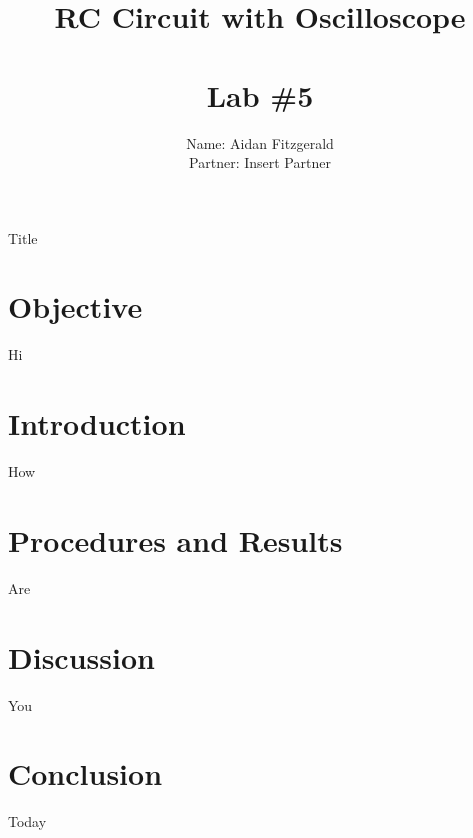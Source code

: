 \documentclass[11pt, titlepage]{article}
\title{\textbf{RC Circuit with Oscilloscope} \\ \ \\ \large Lab \#5 }
\author{Name: Aidan Fitzgerald \\ Partner: Insert Partner}
\date{}
\begin{document}
\maketitle

\begin{center}
\LARGE Title
\end{center}

\section*{Objective}
Hi

\section*{Introduction}
How

\section*{Procedures and Results}
Are

\section*{Discussion}
You

\section*{Conclusion}
Today
\end{document}
